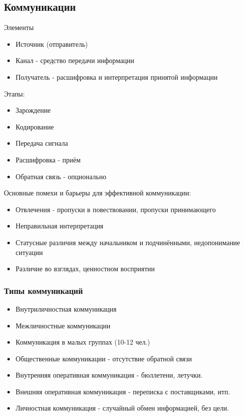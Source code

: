 \documentclass[a4paper,12pt]{report}
\begin{document}
\subsection{Коммуникации}	
	
	Элементы
	\begin{itemize}
	\item	Источник (отправитель)		
	\item	Канал - средство передачи информации
	\item	Получатель - расшифровка и интерпретация принятой информации
	\end{itemize}		
	
	
	Этапы:
	\begin{itemize}
	\item	Зарождение 
	\item	Кодирование
	\item	Передача сигнала
	\item	Расшифровка - приём
	\item	Обратная связь - опционально
	\end{itemize}		

	Основные помехи и барьеры для эффективной коммуникации:
	\begin{itemize}
	\item	Отвлечения - пропуски в повествовании, пропуски принимающего
	\item	Неправильная интерпретация
	\item	Статусные различия между начальником и подчинёнными, недопонимание ситуации
	\item	Различие во взглядах, ценностном восприятии
	\end{itemize}

	\subsubsection{Типы коммуникаций}
	
	\begin{itemize}
	\item	Внутриличностная коммуникация
	
	\item	Межличностные коммуникации
	
	\item	Коммуникация в малых группах (10-12 чел.)
	
	\item	Общественные коммуникации - отсутствие обратной связи
	
	\item	Внутренняя оперативная коммуникация - бюллетени, летучки.
	
	\item	Внешняя оперативная коммуникация - переписка с поставщиками, итп.
	
	\item	Личностная коммуникация - случайный обмен информацией, без цели.
	\end{itemize}
\end{document}
